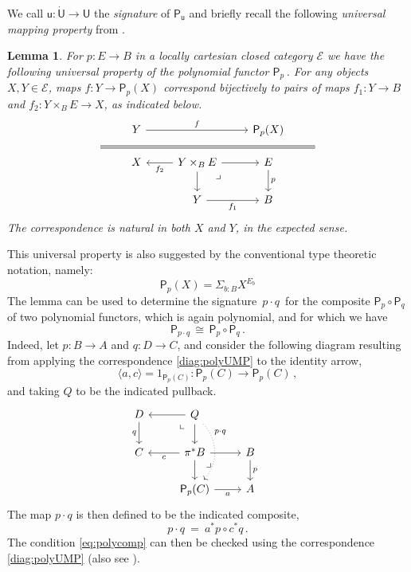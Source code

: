 \documentclass[12pt,reqno]{amsart}
\newcommand{\EE}{\ensuremath{\mathcal{E}}}
\newcommand{\alg}[1]{\ensuremath{\mathsf{#1}}}
\renewcommand{\to}{\ensuremath{\rightarrow}}
\renewcommand{\t}{\ensuremath{\mathsf{u}}}
\newcommand{\T}{\ensuremath{\mathsf{U}}}
\newcommand{\TT}{\ensuremath{\dot{\mathsf{U}}}}
\newcommand{\tT}{\ensuremath{{\t}:\TT\to\T}}
\newcommand{\pbcorner}{\arrow[dr,phantom,"\lrcorner" very near start, shift right=.5ex]} %
\newcommand{\pbcornerright}{\arrow[dl,phantom,"\llcorner" very near start, shift left=.5ex]} %
\newtheorem{lemma}[theorem]{Lemma}
\theoremstyle{remark}
\theoremstyle{definition}
\begin{document}
We call $\tT$ the \emph{signature} of $\alg{P}_\t$ and briefly recall the following \emph{universal mapping property} from \cite{awodey:NM}.

\begin{lemma}
 For $p: E \to B$ in a locally cartesian closed category $\EE$ we have the following universal property of the polynomial functor $\alg{P}_p$\,. For any objects $X, Y \in \EE$, maps $f : Y \to \alg{P}_p (X)$ correspond bijectively to pairs of maps $f_1 : Y \to B$ and $f_2 : Y\times_B E \to X$, as indicated below.
\begin{equation}\label{diag:polyUMP}
\begin{tikzcd}
& Y \ar[rr,"f"] && \alg{P}_p (X) & \\[-5ex]
\strut \ar[rrrr, equal] &&&& \strut\\[-5ex]
&X & \ar[l,"f_2"] Y\times_B E \ar[d] \ar[r] \pbcorner & E \ar[d, "p"] &\\
&& Y \ar[r,swap,"f_1"] & B &
\end{tikzcd}
\end{equation}
The correspondence is natural in both $X$ and $Y$, in the expected sense.
\end{lemma}

This universal property is also suggested by the conventional type theoretic notation, namely: $$\alg{P}_p (X) = \Sigma_{b:B} X^{E_b}$$
The lemma can be used to determine the signature $\, p\cdot q\, $ for the composite $\alg{P}_p \circ \alg{P}_q$ of two polynomial functors, which is again polynomial, and for which we have
\begin{equation}\label{eq:polycomp}
\alg{P}_{p\cdot q}\, \cong\, \alg{P}_p \circ \alg{P}_q\,.
\end{equation}
Indeed, let $p : B \to A$ and $q : D \to C$, and consider the following diagram resulting from applying the correspondence \eqref{diag:polyUMP} to the identity arrow,
\[
\langle a, c\rangle = 1_{\alg{P}_p(C)} : \alg{P}_p(C) \to \alg{P}_p(C)\,,
\]
and taking $Q$ to be the indicated pullback.
%
\begin{equation}\label{diag:polyUMP2}
\begin{tikzcd}
D \ar[d,swap,"q"] & \ar[l] Q \ar[d] \pbcornerright  \ar[dd, dotted, bend left = 10ex ,near start, "{p\cdot q}"]& & \\
 C  & \ar[l,"c"] \pi^*B \ar[d] \ar[r] \pbcorner & B \ar[d,"p"] \\
&  \alg{P}_p(C) \ar[r,swap,"a"] & A
\end{tikzcd}
\end{equation}
The map $p\cdot q$ is then defined to be the indicated composite,
\[
p\cdot q\ =\ a^*p \circ c^*q\,.
\]
The condition \eqref{eq:polycomp} can then be checked using the correspondence \eqref{diag:polyUMP} (also see \cite{GambinoKoch:2013}).
\end{document}
